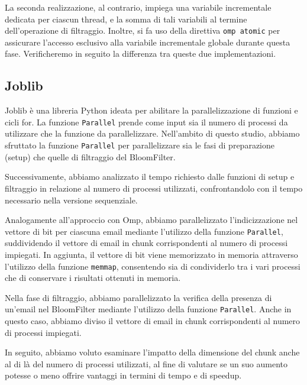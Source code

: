 
La seconda realizzazione, al contrario, impiega una variabile incrementale dedicata per ciascun thread, e la somma di
tali variabili al termine dell'operazione di filtraggio.
Inoltre, si fa uso della direttiva \texttt{omp atomic} per assicurare l'accesso esclusivo alla variabile
incrementale globale durante questa fase.
Verificheremo in seguito la differenza tra queste due implementazioni.

\subsection{Joblib}\label{subsec:joblib}
Joblib è una libreria Python ideata per abilitare la parallelizzazione di funzioni e cicli for.
La funzione \texttt{Parallel} prende come input sia il numero di processi da utilizzare che la funzione da parallelizzare.
Nell'ambito di questo studio, abbiamo sfruttato la funzione \texttt{Parallel} per parallelizzare sia le fasi di
preparazione (setup) che quelle di filtraggio del BloomFilter.

Successivamente, abbiamo analizzato il tempo richiesto dalle funzioni di setup e filtraggio in relazione al numero
di processi utilizzati, confrontandolo con il tempo necessario nella versione sequenziale.

Analogamente all'approccio con Omp, abbiamo parallelizzato l'indicizzazione nel vettore di bit per ciascuna email
mediante l'utilizzo della funzione \texttt{Parallel}, suddividendo il vettore di email in chunk corrispondenti al
numero di processi impiegati.
In aggiunta, il vettore di bit viene memorizzato in memoria attraverso l'utilizzo della funzione \texttt{memmap},
consentendo sia di condividerlo tra i vari processi che di conservare i risultati ottenuti in memoria.


Nella fase di filtraggio, abbiamo parallelizzato la verifica della presenza di un'email nel BloomFilter mediante
l'utilizzo della funzione \texttt{Parallel}.
Anche in questo caso, abbiamo diviso il vettore di email in chunk corrispondenti al numero di processi impiegati.

In seguito, abbiamo voluto esaminare l'impatto della dimensione del chunk anche al di là del numero di processi
utilizzati, al fine di valutare se un suo aumento potesse o meno offrire vantaggi in termini di tempo e di speedup.